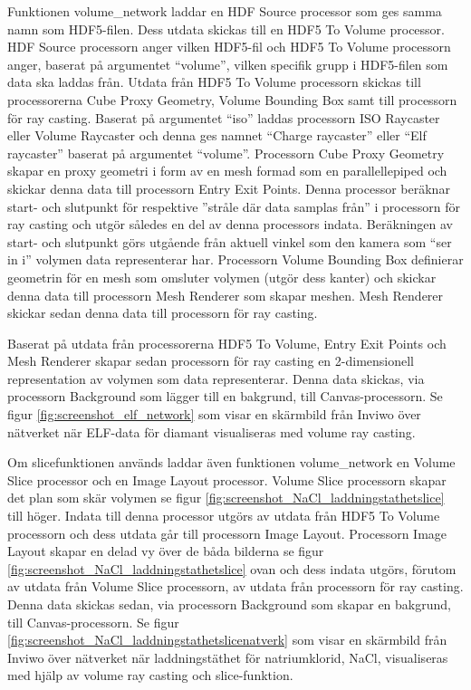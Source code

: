 \documentclass[a4paper,12pt]{article}
\begin{document}
Funktionen volume\_network laddar en HDF Source processor som ges samma namn som HDF5-filen. 
Dess utdata skickas till en HDF5 To Volume processor. HDF Source processorn anger vilken HDF5-fil och HDF5 To Volume processorn anger, baserat på argumentet ``volume”,
vilken specifik grupp i HDF5-filen som data ska laddas från. Utdata från HDF5 To Volume processorn skickas till processorerna Cube Proxy Geometry, Volume Bounding Box samt till processorn för ray casting. Baserat på 
argumentet ``iso” laddas processorn ISO Raycaster eller Volume Raycaster och denna ges namnet 
``Charge raycaster” eller ``Elf raycaster” baserat på argumentet ``volume”. Processorn Cube Proxy 
Geometry skapar en proxy geometri i form av en mesh formad som en parallellepiped
och skickar denna data till processorn Entry Exit Points. Denna processor beräknar start- och slutpunkt för respektive ”stråle där data samplas från” i processorn för ray casting och utgör således en del av denna processors indata. Beräkningen av start- och slutpunkt görs utgående från aktuell vinkel som den 
kamera som ``ser in i” volymen data representerar har. Processorn Volume Bounding Box definierar 
geometrin för en mesh som omsluter volymen (utgör dess kanter) och skickar denna data till 
processorn Mesh Renderer som skapar meshen. Mesh Renderer skickar sedan denna data till 
processorn för ray casting.

Baserat på utdata från processorerna HDF5 To Volume, Entry Exit Points och Mesh Renderer skapar 
sedan processorn för ray casting en 2-dimensionell representation av volymen som data representerar. 
Denna data skickas, via processorn Background som lägger till en bakgrund, till Canvas-processorn. Se figur \ref{fig:screenshot_elf_network} som visar en skärmbild från Inviwo över nätverket när ELF-data för diamant visualiseras med volume ray casting.

Om slicefunktionen används laddar även funktionen volume\_network en Volume Slice processor och en Image Layout processor. Volume Slice processorn skapar det plan som skär volymen se figur \ref{fig:screenshot_NaCl_laddningstathetslice} till höger.
Indata till denna processor utgörs av utdata från HDF5 To Volume processorn och dess utdata 
går till processorn Image Layout. Processorn Image Layout skapar en delad vy över de båda bilderna 
se figur \ref{fig:screenshot_NaCl_laddningstathetslice}
ovan och dess indata utgörs, förutom av utdata från Volume Slice processorn, av utdata 
från processorn för ray casting. Denna data skickas sedan, via processorn Background som skapar en 
bakgrund, till Canvas-processorn. Se figur \ref{fig:screenshot_NaCl_laddningstathetslicenatverk} som visar en skärmbild från Inviwo över nätverket när laddningstäthet för natriumklorid, NaCl, visualiseras med hjälp av volume ray casting och slice-funktion.
\end{document}
